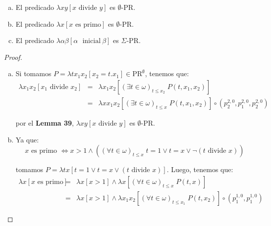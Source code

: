   \begin{lemma}
    \begin{enumerate}[a)]
      \item El predicado $\lambda xy\left[x \text{ divide } y\right]$ es $\emptyset$-PR.
      \item El predicado $\lambda x\left[x \text{ es primo}\right]$ es $\emptyset$-PR.
      \item El predicado $\lambda \alpha\beta \left[\alpha \text{\ }\mathrm{ inicial}\ \beta \right]$ es $\Sigma$-PR.
    \end{enumerate}
  \end{lemma}
  \begin{proof}
    \begin{enumerate}[a)]
      \item Si tomamos $P = \lambda tx_{1}x_{2}\left[x_{2}=t.x_{1}\right] \in \mathrm{PR}^{\emptyset}$, tenemos que:
        \begin{eqnarray*}
          \lambda x_{1}x_{2} \left[x_{1}\text{ divide } x_{2}\right] &=& \lambda x_{1}x_{2}\left[(\exists t
            \in \omega)_{t\leq x_{2}} \; P(t,x_{1},x_{2}) \right] \\
          &=& \lambda xx_{1}x_{2}\left[(\exists t \in \omega)_{t\leq x} \; P(t,x_{1},x_{2})\right] \circ
            \left(p_{2}^{2,0}, p_{1}^{2,0}, p_{2}^{2,0}\right)
        \end{eqnarray*}

        \PN por el \textbf{Lemma 39}, $\lambda xy\left[x \text{ divide } y\right]$ es $\emptyset$-PR.

      \item Ya que:
        \[
          x \text{ es primo } \Leftrightarrow x > 1 \wedge \left((\forall t \in \omega)_{t\leq x} \; t=1 \vee t=x \vee
          \lnot (t\text{ divide } x)\right)
        \]

        \PN tomamos $P = \lambda tx \left[ t=1 \vee t=x \vee (t \text{ divide } x)\right]$. Luego, tenemos que:
        \begin{eqnarray*}
          \lambda x \left[x \text{ es primo}\right] &=& \lambda x \left[x > 1\right] \wedge \lambda x
            \left[(\forall t \in \omega)_{t \leq x} \; P(t,x) \right] \\
          &=& \lambda x \left[x > 1\right] \wedge \lambda x_{1} x_{2} \left[(\forall t \in \omega)_{t \leq
            x_{1}} \; P(t,x_{2}) \right] \circ (p_{1}^{1,0}, p_{1}^{1,0})
        \end{eqnarray*}


\end{enumerate}
\end{proof}
